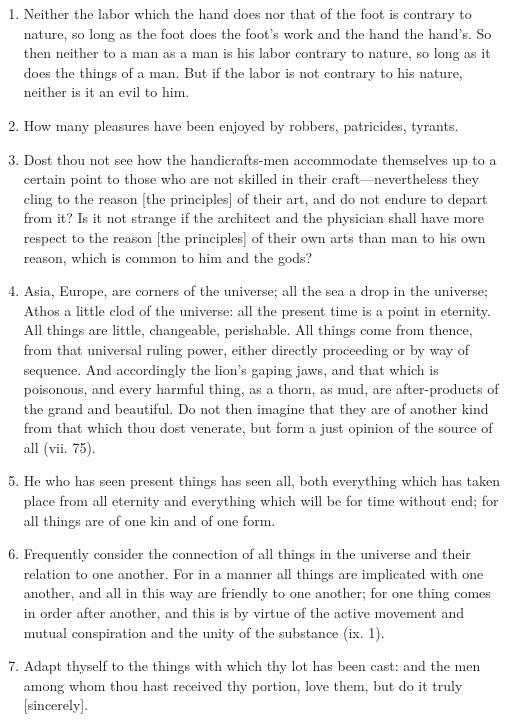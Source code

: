 \begin{enumerate}
\item Neither the labor which the hand does nor that of the foot is contrary to nature, so long as the foot does the foot's work and the hand the hand's. So then neither to a man as a man is his labor contrary to nature, so long as it does the things of a man. But if the labor is not contrary to his nature, neither is it an evil to him.

\item How many pleasures have been enjoyed by robbers, patricides, tyrants.

\item Dost thou not see how the handicrafts-men accommodate themselves up to a certain point to those who are not skilled in their craft—nevertheless they cling to the reason [{\clarify the principles}] of their art, and do not endure to depart from it? Is it not strange if the architect and the physician shall have more respect to the reason [{\clarify the principles}] of their own arts than man to his own reason, which is common to him and the gods?

\item Asia, Europe, are corners of the universe; all the sea a drop in the universe; Athos a little clod of the universe: all the present time is a point in eternity. All things are little, changeable, perishable. All things come from thence, from that universal ruling power, either directly proceeding or by way of sequence. And accordingly the lion's gaping jaws, and that which is poisonous, and every harmful thing, as a thorn, as mud, are after-products of the grand and beautiful. Do not then imagine that they are of another kind from that which thou dost venerate, but form a just opinion of the source of all (vii. 75).

\item He who has seen present things has seen all, both everything which has taken place from all eternity and everything which will be for time without end; for all things are of one kin and of one form.

\item Frequently consider the connection of all things in the universe and their relation to one another. For in a manner all things are implicated with one another, and all in this way are friendly to one another; for one thing comes in order after another, and this is by virtue of the active movement and mutual conspiration and the unity of the substance (ix. 1).

\item Adapt thyself to the things with which thy lot has been cast: and the men among whom thou hast received thy portion, love them, but do it truly [{\clarify sincerely}].


\end{enumerate}
